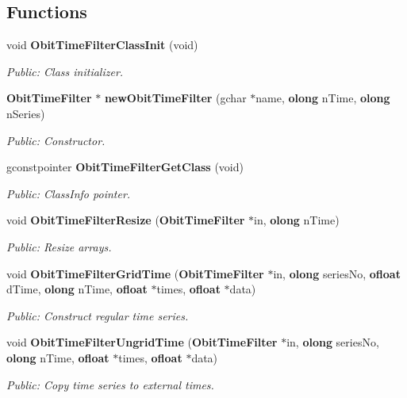 \subsection*{Functions}
\begin{CompactItemize}
\item 
void {\bf Obit\-Time\-Filter\-Class\-Init} (void)
\begin{CompactList}\small\item\em Public: Class initializer. \item\end{CompactList}\item 
{\bf Obit\-Time\-Filter} $\ast$ {\bf new\-Obit\-Time\-Filter} (gchar $\ast$name, {\bf olong} n\-Time, {\bf olong} n\-Series)
\begin{CompactList}\small\item\em Public: Constructor. \item\end{CompactList}\item 
gconstpointer {\bf Obit\-Time\-Filter\-Get\-Class} (void)
\begin{CompactList}\small\item\em Public: Class\-Info pointer. \item\end{CompactList}\item 
void {\bf Obit\-Time\-Filter\-Resize} ({\bf Obit\-Time\-Filter} $\ast$in, {\bf olong} n\-Time)
\begin{CompactList}\small\item\em Public: Resize arrays. \item\end{CompactList}\item 
void {\bf Obit\-Time\-Filter\-Grid\-Time} ({\bf Obit\-Time\-Filter} $\ast$in, {\bf olong} series\-No, {\bf ofloat} d\-Time, {\bf olong} n\-Time, {\bf ofloat} $\ast$times, {\bf ofloat} $\ast$data)
\begin{CompactList}\small\item\em Public: Construct regular time series. \item\end{CompactList}\item 
void {\bf Obit\-Time\-Filter\-Ungrid\-Time} ({\bf Obit\-Time\-Filter} $\ast$in, {\bf olong} series\-No, {\bf olong} n\-Time, {\bf ofloat} $\ast$times, {\bf ofloat} $\ast$data)
\begin{CompactList}\small\item\em Public: Copy time series to external times. \item\end{CompactList}\item 

\end{CompactItemize}
